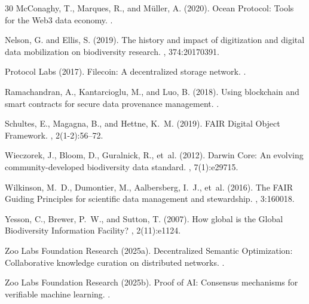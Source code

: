 \begin{thebibliography}{30}
McConaghy, T., Marques, R., and M\"{u}ller, A. (2020).
\newblock Ocean Protocol: Tools for the Web3 data economy.
.

Nelson, G. and Ellis, S. (2019).
\newblock The history and impact of digitization and digital data mobilization on biodiversity research.
, 374:20170391.

Protocol Labs (2017).
\newblock Filecoin: A decentralized storage network.
.

Ramachandran, A., Kantarcioglu, M., and Luo, B. (2018).
\newblock Using blockchain and smart contracts for secure data provenance management.
.

Schultes, E., Magagna, B., and Hettne, K.~M. (2019).
\newblock FAIR Digital Object Framework.
, 2(1-2):56--72.

Wieczorek, J., Bloom, D., Guralnick, R., et~al. (2012).
\newblock Darwin Core: An evolving community-developed biodiversity data standard.
, 7(1):e29715.

Wilkinson, M.~D., Dumontier, M., Aalbersberg, I.~J., et~al. (2016).
\newblock The FAIR Guiding Principles for scientific data management and stewardship.
, 3:160018.

Yesson, C., Brewer, P.~W., and Sutton, T. (2007).
\newblock How global is the Global Biodiversity Information Facility?
, 2(11):e1124.

Zoo Labs Foundation Research (2025a).
\newblock Decentralized Semantic Optimization: Collaborative knowledge curation on distributed networks.
.

Zoo Labs Foundation Research (2025b).
\newblock Proof of AI: Consensus mechanisms for verifiable machine learning.
.


\end{thebibliography}
